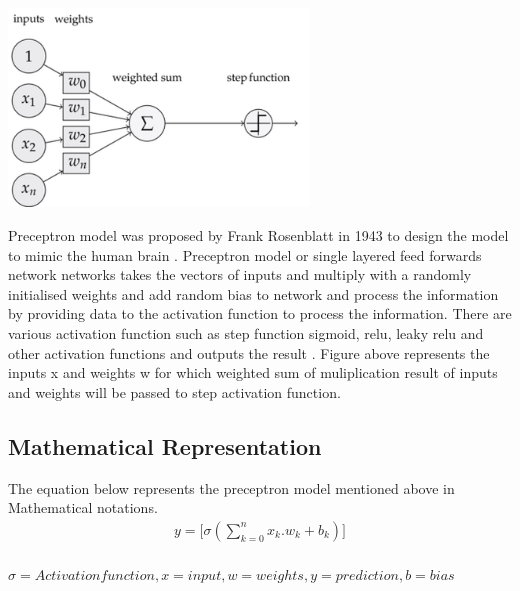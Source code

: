 
\begin{center}
    \includegraphics[width=0.6\textwidth]{Images/p_model.png} \\
\end{center}
\vspace{2mm}
Preceptron model was proposed by Frank Rosenblatt in 1943 to design the model to 
mimic the human brain \citep*{939589}. Preceptron model or single layered feed forwards network 
networks takes the vectors of inputs and multiply with a randomly 
initialised weights and add random bias to network and process the information by providing data to the activation function to process the information.
There are various activation function such as  step function sigmoid, 
relu, leaky relu and other activation functions and outputs the result \citep{AGATONOVICKUSTRIN2000717}.
Figure above represents the inputs x and weights w for which weighted sum of muliplication result of 
inputs and weights will be passed to step activation function.

\subsection{Mathematical Representation }
\vspace{3mm}
{The equation below represents the preceptron model mentioned above in Mathematical notations.}
\begin{equation}
    \begin{split}
        y = \Big[\sigma(\sum_{k=0}^n x_k.w_k + b_k)\Big] \\
    \end{split}
\end{equation}

$ {\sigma = Activation function ,
        x = input , 
        w = weights ,
        y = prediction , 
        b = bias
    } $ 
